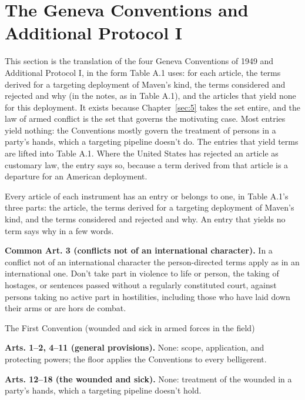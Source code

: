 \section{The Geneva Conventions and Additional Protocol I}
\label{sec:A.2}
This section is the translation of the four Geneva Conventions of 1949 and Additional Protocol I, in the form Table A.1 uses: for each article, the terms derived for a targeting deployment of Maven's kind, the terms considered and rejected and why (in the notes, as in Table A.1), and the articles that yield none for this deployment. It exists because Chapter~\ref{sec:5} takes the set entire, and the law of armed conflict is the set that governs the motivating case. Most entries yield nothing: the Conventions mostly govern the treatment of persons in a party's hands, which a targeting pipeline doesn't do. The entries that yield terms are lifted into Table A.1. Where the United States has rejected an article as customary law, the entry says so, because a term derived from that article is a departure for an American deployment.

Every article of each instrument has an entry or belongs to one, in Table A.1's three parts: the article, the terms derived for a targeting deployment of Maven's kind, and the terms considered and rejected and why. An entry that yields no term says why in a few words.


\textbf{Common Art. 3 (conflicts not of an international character).} In a conflict not of an international character the person-directed terms apply as in an international one. Don't take part in violence to life or person, the taking of hostages, or sentences passed without a regularly constituted court, against persons taking no active part in hostilities, including those who have laid down their arms or are hors de combat.

The First Convention (wounded and sick in armed forces in the field)

\textbf{Arts. 1–2, 4–11 (general provisions).} None: scope, application, and protecting powers; the floor applies the Conventions to every belligerent.

\textbf{Arts. 12–18 (the wounded and sick).} None: treatment of the wounded in a party's hands, which a targeting pipeline doesn't hold.


